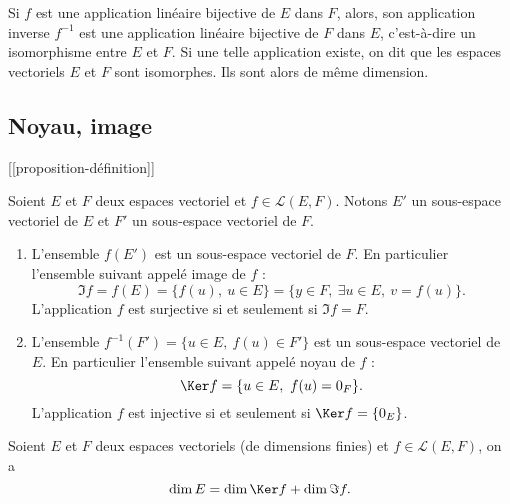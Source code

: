 \documentclass[class=report,crop=false]{standalone}
\begin{document}
\begin{proposition}
Si $f$ est une application linéaire bijective de $E$ dans $F$, 
alors, son application inverse $f^{-1}$ est une application linéaire 
bijective de $F$ dans $E$, c'est-à-dire un isomorphisme entre $E$ et $F$. 
Si une telle application existe, on dit que les espaces vectoriels $E$ et $F$ 
sont isomorphes. Ils sont alors de même dimension.
\end{proposition} 


\subsection{Noyau, image}

[[proposition-définition]]

\begin{proposition}
Soient $E$ et $F$ deux espaces vectoriel et $f\in\mathcal{L}(E,F)$. 
Notons $E'$ un sous-espace vectoriel de $E$ et $F'$ un sous-espace vectoriel de $F$.

\begin{enumerate}
  \item L'ensemble $f(E')$ est un sous-espace vectoriel de $F$. En particulier l'ensemble suivant appelé image de $f$ :
$$\Im f=f(E)=\{f(u),\ u\in E\}=\{y\in F,\ \exists u\in E,\ v=f(u)\}.$$
L'application $f$ est surjective si et seulement si $\Im f=F$.

  \item L'ensemble $f^{-1}(F')=\{u\in E,\ f(u)\in F'\}$ est un sous-espace vectoriel de $E$. En particulier l'ensemble suivant appelé noyau de $f$ :
$$\Ker f=\{u\in E,\ f(u)=0_F\}.$$
L'application $f$ est injective si et seulement si $\Ker f=\{0_E\}$.
  
\end{enumerate}

  
\end{proposition}

\begin{theoreme}
Soient $E$ et $F$ deux espaces vectoriels (de dimensions finies) et $f\in\mathcal{L}(E,F)$, on a
$$\dim E=\dim \Ker f+\dim \Im f.$$  
\end{theoreme}
\end{document}
